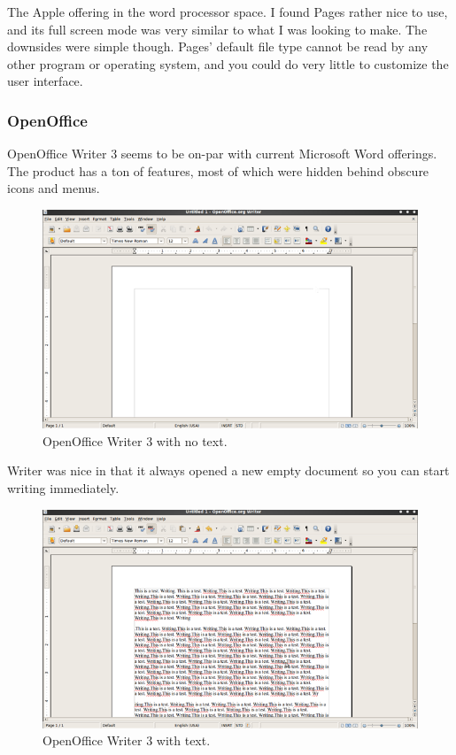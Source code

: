 \documentclass[10pt]{article}
\begin{document}
The Apple offering in the word processor space. I found Pages rather nice to use, and its full screen mode was very similar to what I was looking to make. The downsides were simple though. Pages' default file type cannot be read by any other program or operating system, and you could do very little to customize the user interface.

\subsubsection{OpenOffice}

OpenOffice Writer 3 seems to be on-par with current Microsoft Word offerings. The product has a ton of features, most of which were hidden behind obscure icons and menus.

\begin{figure}
   \centering
      \includegraphics[width=130mm]{images/oo1.png}
   \caption{OpenOffice Writer 3 with no text.}
\end{figure}

Writer was nice in that it always opened a new empty document so you can start writing immediately.

\begin{figure}
   \centering
      \includegraphics[width=130mm]{images/oo2.png}
   \caption{OpenOffice Writer 3 with text.}
\end{figure}
\end{document}
